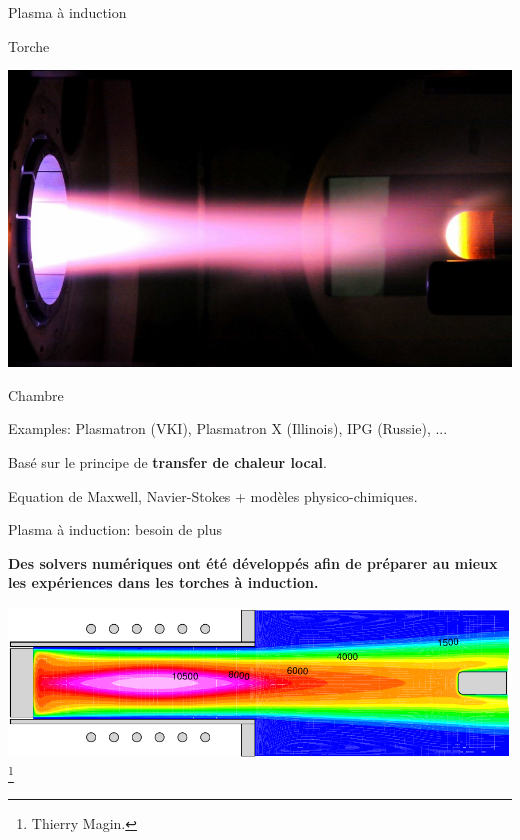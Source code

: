 \documentclass[24pt,t,table, aspectratio=169]{beamer}
\begin{document}
\begin{frame}{Plasma à induction}
\begin{minipage}[t]{0.5\linewidth}
\begin{tikzpicture}[scale=0.7]
    \end{tikzpicture}
    
    \vspace{0.45cm}
    Torche
    \end{minipage}
    \begin{minipage}[t]{0.49\linewidth}
    \centering
    \vspace{0.5cm}\includegraphics[width=\linewidth]{Ablation-testing-at-the-Plasmatron-ICP-facility-of-the-VKI-3.jpg}
    
    Chambre
    \end{minipage}
    
    {
    Examples: Plasmatron (VKI), Plasmatron X (Illinois), IPG (Russie), ...
    
    Basé sur le principe de \textbf{transfer de chaleur local}.
    }
    {
    	Equation de Maxwell, Navier-Stokes + modèles physico-chimiques.
    }
\end{frame}

\begin{frame}{Plasma à induction: besoin de plus}

\begin{center}
\begin{framed}
\textbf{Des solvers numériques ont été développés afin de préparer au mieux les expériences dans les torches à induction.}
\end{framed}
\includegraphics[width=.7\linewidth]{lhtsT.pdf}\footnote{\tiny Thierry Magin.}
\end{center}
\end{frame}
\end{document}
